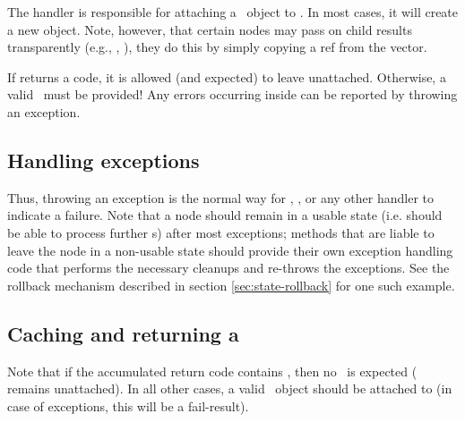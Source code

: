  The  handler is responsible for attaching a \Result\ object
  to . In most cases, it will create a new object. Note, however,
  that certain nodes may pass on child results transparently (e.g.,
  , ), they do this by simply copying a ref from the
   vector. 
  
  If  returns a  code, it is allowed (and expected)
  to leave  unattached. Otherwise, a valid \Result\ must be
  provided! Any errors occurring inside  can be reported by
  throwing an exception.

\subsection{Handling exceptions}


  Thus, throwing an exception is the normal way for ,
  , or any other handler to indicate a failure. Note that a
  node should remain in a usable state (i.e. should be able to process further
  \Request{}s) after most exceptions; methods that are liable to leave the node
  in a non-usable state should provide their own exception handling code that
  performs the necessary cleanups and re-throws the exceptions. See the
   rollback mechanism described in section
  \ref{sec:state-rollback} for one such example.

\subsection{Caching and returning a \Result}
\label{sec:execute-return}
 

  Note that if the accumulated return code contains , then no
  \Result\ is expected ( remains unattached). In all other cases, a
  valid \Result\ object should be attached to  (in case of
  exceptions, this will be a fail-result).

